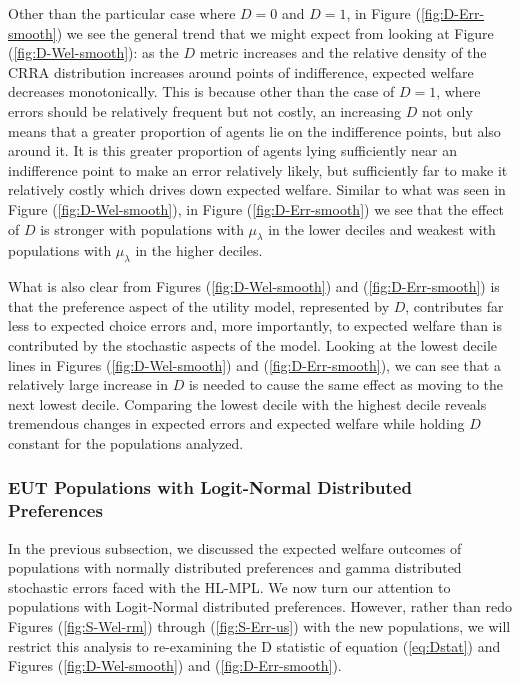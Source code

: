\documentclass[../main.tex]{subfiles}
\begin{document}
\addtocounter{footnote}{-1}

Other than the particular case where $D=0$ and $D=1$, in Figure (\ref{fig:D-Err-smooth}) we see the general trend that we might expect from looking at Figure (\ref{fig:D-Wel-smooth}): as the $D$ metric increases and the relative density of the CRRA distribution increases around points of indifference, expected welfare decreases monotonically.
This is because other than the case of $D=1$, where errors should be relatively frequent but not costly, an increasing $D$ not only means that a greater proportion of agents lie on the indifference points, but also around it.
It is this greater proportion of agents lying sufficiently near an indifference point to make an error relatively likely, but sufficiently far to make it relatively costly which drives down expected welfare.
Similar to what was seen in Figure (\ref{fig:D-Wel-smooth}), in Figure (\ref{fig:D-Err-smooth}) we see that the effect of $D$ is stronger with populations with $\mu_\lambda$ in the lower deciles and weakest with populations with $\mu_\lambda$ in the higher deciles.

What is also clear from Figures (\ref{fig:D-Wel-smooth}) and (\ref{fig:D-Err-smooth}) is that the preference aspect of the utility model, represented by $D$, contributes far less to expected choice errors and, more importantly, to expected welfare than is contributed by the stochastic aspects of the model.
Looking at the lowest decile lines in Figures (\ref{fig:D-Wel-smooth}) and (\ref{fig:D-Err-smooth}), we can see that a relatively large increase in $D$ is needed to cause the same effect as moving to the next lowest decile.
Comparing the lowest decile with the highest decile reveals tremendous changes in expected errors and expected welfare while holding $D$ constant for the populations analyzed.

\subsubsection{EUT Populations with Logit-Normal Distributed Preferences}

In the previous subsection, we discussed the expected welfare outcomes of populations with normally distributed preferences and gamma distributed stochastic errors faced with the HL-MPL.
We now turn our attention to populations with Logit-Normal distributed preferences.
However, rather than redo Figures (\ref{fig:S-Wel-rm}) through (\ref{fig:S-Err-us}) with the new populations, we will restrict this analysis to re-examining the D statistic of equation (\ref{eq:Dstat}) and Figures (\ref{fig:D-Wel-smooth}) and (\ref{fig:D-Err-smooth}).
\end{document}
